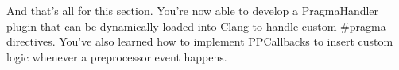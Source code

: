 And that's all for this section. You're now able to develop a PragmaHandler plugin that can be dynamically loaded into Clang to handle custom \#pragma directives. You've also learned how to implement PPCallbacks to insert custom logic whenever a preprocessor event happens.


















